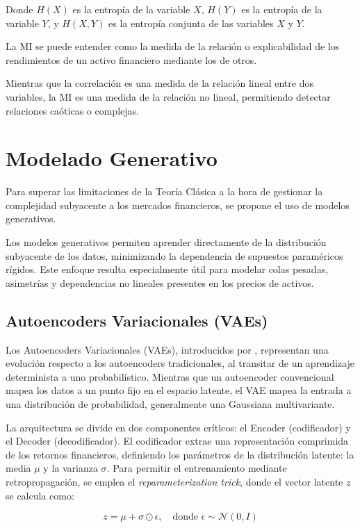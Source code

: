 Donde $H(X)$ es la entropía de la variable $X$, $H(Y)$ es la entropía de la variable $Y$, y $H(X,Y)$ es la entropía conjunta de las variables $X$ y $Y$.

La MI se puede entender como la medida de la relación o explicabilidad de los rendimientos de un activo financiero mediante los de otros.

Mientras que la correlación es una medida de la relación lineal entre dos variables, la MI es una medida de la relación no lineal, permitiendo detectar relaciones caóticas o complejas.

\section{Modelado Generativo}

Para superar las limitaciones de la Teoría Clásica a la hora de gestionar la complejidad subyacente a los mercados financieros, se propone el uso de modelos generativos.

Los modelos generativos permiten aprender directamente de la distribución subyacente de los datos, minimizando la dependencia de supuestos paraméricos rígidos. Este enfoque resulta especialmente útil para modelar colas pesadas, asimetrías y dependencias no lineales presentes en los precios de activos.

\subsection{Autoencoders Variacionales (VAEs)}

Los Autoencoders Variacionales (VAEs), introducidos por \cite{kingma2013auto}, representan una evolución respecto a los autoencoders tradicionales, al transitar de un aprendizaje determinista a uno probabilístico. Mientras que un autoencoder convencional mapea los datos a un punto fijo en el espacio latente, el VAE mapea la entrada a una distribución de probabilidad, generalmente una Gaussiana multivariante.

La arquitectura se divide en dos componentes críticos: el Encoder (codificador) y el Decoder (decodificador). El codificador extrae una representación comprimida de los retornos financieros, definiendo los parámetros de la distribución latente: la media $\mu$ y la varianza $\sigma$. Para permitir el entrenamiento mediante retropropagación, se emplea el \textit{reparameterization trick}, donde el vector latente $z$ se calcula como:

\begin{equation}
    z = \mu + \sigma \odot \epsilon, \quad \text{donde } \epsilon \sim \mathcal{N}(0, I)
\end{equation}

